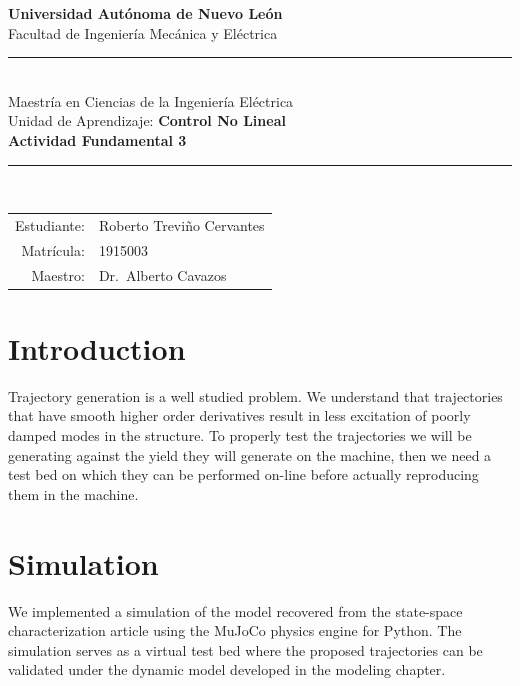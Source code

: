 \documentclass[11pt,letterpaper]{article}
\begin{document}
\thispagestyle{empty}
\begin{center}
  {\bfseries Universidad Autónoma de Nuevo León}\\
  Facultad de Ingeniería Mecánica y Eléctrica\\[0.6em]
  \textcolor{uanlBlue}{\rule{\linewidth}{1pt}}\\[0.6em]
  Maestría en Ciencias de la Ingeniería Eléctrica\\
  Unidad de Aprendizaje: \textbf{Control No Lineal}\\[1.2em]
  {\LARGE\bfseries Actividad Fundamental 3}\\[1em]
  \textcolor{uanlBlue}{\rule{0.6\linewidth}{0.4pt}}\\[1em]
  \begin{tabular}{rl}
    Estudiante: & Roberto Treviño Cervantes \\
    Matrícula:  & 1915003 \\
    Maestro:    & Dr.\ Alberto Cavazos \\
  \end{tabular}
\end{center}

\vfill
\newpage
\setcounter{page}{1}


\section*{Introduction}

Trajectory generation is a well studied problem. We understand that trajectories that have smooth higher order derivatives result in less excitation of poorly damped modes in the structure. To properly test the trajectories we will be generating against the yield they will generate on the machine, then we need a test bed on which they can be performed on-line before actually reproducing them in the machine.

\section*{Simulation}

We implemented a simulation of the model recovered from the state-space characterization article using the MuJoCo physics engine for Python. The simulation serves as a virtual test bed where the proposed trajectories can be validated under the dynamic model developed in the modeling chapter.
\end{document}
